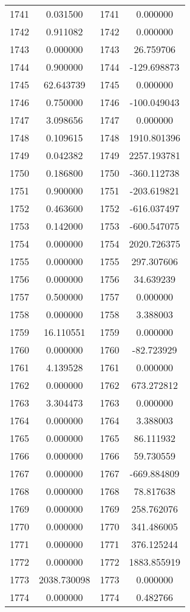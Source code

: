 \documentclass[12pt]{article}
\begin{document}
\begin{longtable}{@{}cccc@{}}
1741 & 0.031500 & 1741 & 0.000000 \\
1742 & 0.911082 & 1742 & 0.000000 \\
1743 & 0.000000 & 1743 & 26.759706 \\
1744 & 0.900000 & 1744 & -129.698873 \\
1745 & 62.643739 & 1745 & 0.000000 \\
1746 & 0.750000 & 1746 & -100.049043 \\
1747 & 3.098656 & 1747 & 0.000000 \\
1748 & 0.109615 & 1748 & 1910.801396 \\
1749 & 0.042382 & 1749 & 2257.193781 \\
1750 & 0.186800 & 1750 & -360.112738 \\
1751 & 0.900000 & 1751 & -203.619821 \\
1752 & 0.463600 & 1752 & -616.037497 \\
1753 & 0.142000 & 1753 & -600.547075 \\
1754 & 0.000000 & 1754 & 2020.726375 \\
1755 & 0.000000 & 1755 & 297.307606 \\
1756 & 0.000000 & 1756 & 34.639239 \\
1757 & 0.500000 & 1757 & 0.000000 \\
1758 & 0.000000 & 1758 & 3.388003 \\
1759 & 16.110551 & 1759 & 0.000000 \\
1760 & 0.000000 & 1760 & -82.723929 \\
1761 & 4.139528 & 1761 & 0.000000 \\
1762 & 0.000000 & 1762 & 673.272812 \\
1763 & 3.304473 & 1763 & 0.000000 \\
1764 & 0.000000 & 1764 & 3.388003 \\
1765 & 0.000000 & 1765 & 86.111932 \\
1766 & 0.000000 & 1766 & 59.730559 \\
1767 & 0.000000 & 1767 & -669.884809 \\
1768 & 0.000000 & 1768 & 78.817638 \\
1769 & 0.000000 & 1769 & 258.762076 \\
1770 & 0.000000 & 1770 & 341.486005 \\
1771 & 0.000000 & 1771 & 376.125244 \\
1772 & 0.000000 & 1772 & 1883.855919 \\
1773 & 2038.730098 & 1773 & 0.000000 \\
1774 & 0.000000 & 1774 & 0.482766 \\

\end{longtable}
\end{document}
